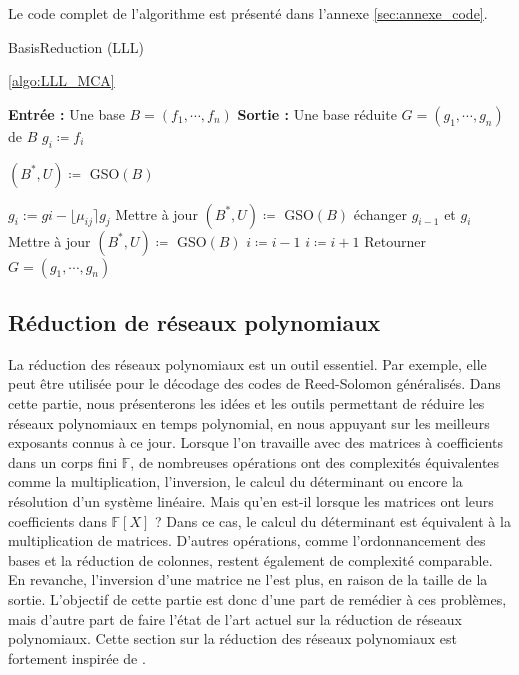 \documentclass[a4paper,12pt]{report}  %
\theoremstyle{definitionstyle}
\theoremstyle{examplestyle}
\theoremstyle{remarkstyle}
\theoremstyle{propositionstyle}
\theoremstyle{theoremstyle}
\theoremstyle{proofstyle}
\begin{document}
	Le code complet de l'algorithme est présenté dans l'annexe \ref{sec:annexe_code}.
	\begin{algorithm}
		\caption{BasisReduction (LLL) \cite{MCA}}
		\label{algo:LLL_MCA} 
		\ref{algo:LLL_MCA}
			
		\begin{algorithmic}[1]
			\State \textbf{Entrée :} Une base $B=(f_1, \cdots, f_n)$
			\State \textbf{Sortie :} Une base réduite $G=(g_1, \cdots, g_n)$ de $B$
				\State $g_i \coloneqq f_i$
			\EndFor
			
			\State $(B^*, U)\coloneqq$ GSO$(B)$
			
			\State $g_i:=gi-\lfloor \mu_{ij} \rceil g_j$
			\State Mettre à jour $(B^*, U)\coloneqq$ GSO$(B)$
			\EndFor
			\State échanger $g_{i-1}$ et $g_i$
			\State Mettre à jour $(B^*, U)\coloneqq$ GSO$(B)$
			\State $i \coloneqq i-1$ 
			\Else 
			\State $i \coloneqq i+1$
			\EndIf
			\EndWhile
			\State Retourner $G=(g_1, \cdots, g_n)$
		\end{algorithmic}
	\end{algorithm}
	
	\subsection{Réduction de réseaux polynomiaux}
	
	
	La réduction des réseaux polynomiaux est un outil essentiel. Par exemple, elle peut être utilisée pour le décodage des codes de Reed-Solomon généralisés. Dans cette partie, nous présenterons les idées et les outils permettant de réduire les réseaux polynomiaux en temps polynomial, en nous appuyant sur les meilleurs exposants connus à ce jour. Lorsque l'on travaille avec des matrices à coefficients dans un corps fini \(\mathbb{F}\), de nombreuses opérations ont des complexités équivalentes comme la multiplication, l'inversion, le calcul du déterminant ou encore la résolution d'un système linéaire. Mais qu'en est-il lorsque les matrices ont leurs coefficients dans \(\mathbb{F}[X]\) ? Dans ce cas, le calcul du déterminant est équivalent à la multiplication de matrices. D'autres opérations, comme l'ordonnancement des bases et la réduction de colonnes, restent également de complexité comparable. En revanche, l'inversion d'une matrice ne l'est plus, en raison de la taille de la sortie. L'objectif de cette partie est donc d'une part de remédier à ces problèmes, mais d'autre part de faire l'état de l'art actuel sur la réduction de réseaux polynomiaux. Cette section sur la réduction des réseaux polynomiaux est fortement inspirée de \cite{CCLebreton}.  
	
\end{document}
